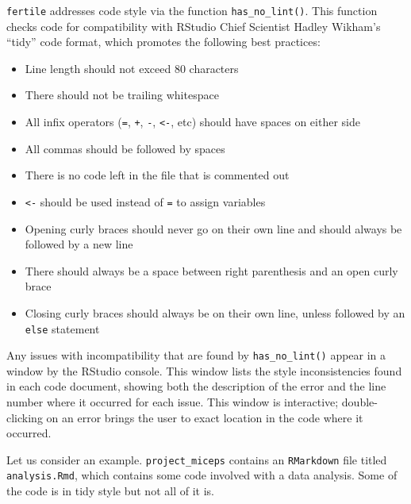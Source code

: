 \documentclass[12pt,twoside]{reedthesis}
\providecommand{\tightlist}{%
  \setlength{\itemsep}{0pt}\setlength{\parskip}{0pt}}
\begin{document}
\texttt{fertile} addresses code style via the function \texttt{has\_no\_lint()}. This function checks code for compatibility with RStudio Chief Scientist Hadley Wikham's ``tidy'' code format, which promotes the following best practices:
\begin{itemize}
\tightlist
\item
  Line length should not exceed 80 characters
\item
  There should not be trailing whitespace
\item
  All infix operators (\texttt{=}, \texttt{+}, \texttt{-}, \texttt{\textless{}-}, etc) should have spaces on either side
\item
  All commas should be followed by spaces
\item
  There is no code left in the file that is commented out
\item
  \texttt{\textless{}-} should be used instead of \texttt{=} to assign variables
\item
  Opening curly braces should never go on their own line and should always be followed by a new line
\item
  There should always be a space between right parenthesis and an open curly brace
\item
  Closing curly braces should always be on their own line, unless followed by an \texttt{else} statement
\end{itemize}
Any issues with incompatibility that are found by \texttt{has\_no\_lint()} appear in a window by the RStudio console. This window lists the style inconsistencies found in each code document, showing both the description of the error and the line number where it occurred for each issue. This window is interactive; double-clicking on an error brings the user to exact location in the code where it occurred.

Let us consider an example. \texttt{project\_miceps} contains an \texttt{RMarkdown} file titled \texttt{analysis.Rmd}, which contains some code involved with a data analysis. Some of the code is in tidy style but not all of it is.
\end{document}

